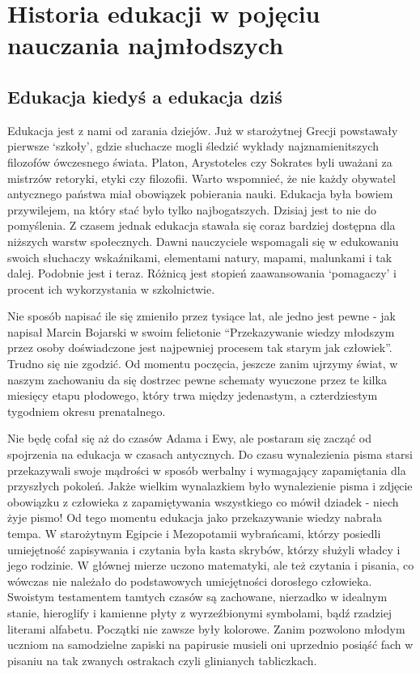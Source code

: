 \documentclass{article}
\begin{document}
\section{Historia edukacji w pojęciu nauczania najmłodszych}
\subsection{Edukacja kiedyś a edukacja dziś}

\par
Edukacja jest z nami od zarania dziejów. Już w starożytnej Grecji powstawały pierwsze ‘szkoły’, gdzie słuchacze mogli śledzić wykłady najznamienitszych filozofów ówczesnego świata. Platon, Arystoteles czy Sokrates byli uważani za mistrzów retoryki, etyki czy filozofii. Warto wspomnieć, że nie każdy obywatel antycznego państwa miał obowiązek pobierania nauki. Edukacja była bowiem przywilejem, na który stać było tylko najbogatszych. Dzisiaj jest to nie do pomyślenia. Z czasem jednak edukacja stawała się coraz bardziej dostępna dla niższych warstw społecznych. Dawni nauczyciele wspomagali się w edukowaniu swoich słuchaczy wskaźnikami, elementami natury, mapami, malunkami i tak dalej. Podobnie jest i teraz. Różnicą jest stopień zaawansowania ‘pomagaczy’ i procent ich wykorzystania w szkolnictwie.
\par
Nie sposób napisać ile się zmieniło przez tysiące lat, ale jedno jest pewne - jak napisał \cite{ref1} Marcin Bojarski w swoim felietonie “Przekazywanie wiedzy młodszym przez osoby doświadczone jest najpewniej procesem tak starym jak człowiek”. Trudno się nie zgodzić. Od momentu poczęcia, jeszcze zanim ujrzymy świat, w naszym zachowaniu da się dostrzec pewne schematy wyuczone przez te kilka miesięcy etapu płodowego, który trwa między jedenastym, a czterdziestym tygodniem okresu prenatalnego.
\par
Nie będę cofał się aż do czasów Adama i Ewy, ale postaram się zacząć od spojrzenia na edukacja w czasach antycznych. Do czasu wynalezienia pisma starsi przekazywali swoje mądrości w sposób werbalny i wymagający zapamiętania dla przyszłych pokoleń. Jakże wielkim wynalazkiem było wynalezienie pisma i zdjęcie obowiązku z człowieka z zapamiętywania wszystkiego co mówił dziadek - niech żyje pismo! Od tego momentu edukacja jako przekazywanie wiedzy nabrała tempa. W starożytnym Egipcie i Mezopotamii wybrańcami, którzy posiedli umiejętność zapisywania i czytania była kasta skrybów, którzy służyli władcy i jego rodzinie. W głównej mierze uczono matematyki, ale też czytania i pisania, co wówczas nie należało do podstawowych umiejętności dorosłego człowieka. Swoistym testamentem tamtych czasów są zachowane, nierzadko w idealnym stanie, hieroglify i kamienne płyty z wyrzeźbionymi symbolami, bądź rzadziej literami alfabetu. Początki nie zawsze były kolorowe. Zanim pozwolono młodym uczniom na samodzielne zapiski na papirusie musieli oni uprzednio posiąść fach w pisaniu na tak zwanych ostrakach czyli glinianych tabliczkach.
\end{document}
